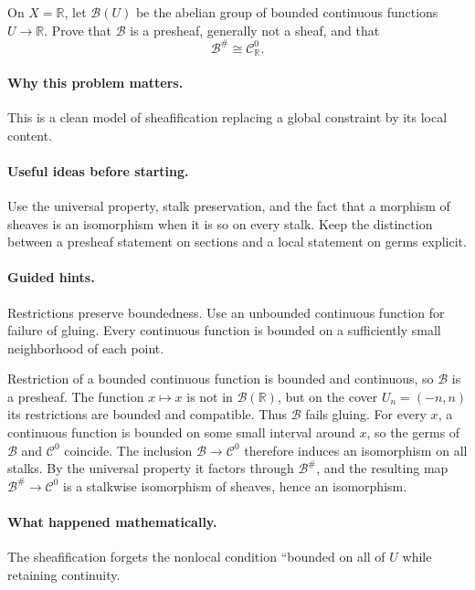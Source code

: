 \begin{problem}
On $X=\mathbb R$, let $\mathcal B(U)$ be the abelian group of bounded continuous functions $U\to\mathbb R$. Prove that $\mathcal B$ is a presheaf, generally not a sheaf, and that
\[
\mathcal B^\#\cong\mathcal C^0_{\mathbb R}.
\]
\end{problem}

\paragraph{Why this problem matters.}
This is a clean model of sheafification replacing a global constraint by its local content.

\paragraph{Useful ideas before starting.}
Use the universal property, stalk preservation, and the fact that a morphism of sheaves is an isomorphism when it is so on every stalk.  Keep the distinction between a presheaf statement on sections and a local statement on germs explicit.

\paragraph{Guided hints.}
Restrictions preserve boundedness.  Use an unbounded continuous function for failure of gluing.  Every continuous function is bounded on a sufficiently small neighborhood of each point.

\ifdefined\FullProblemDossiers
\begin{solution}
Restriction of a bounded continuous function is bounded and continuous, so $\mathcal B$ is a presheaf. The function $x\mapsto x$ is not in $\mathcal B(\mathbb R)$, but on the cover $U_n=(-n,n)$ its restrictions are bounded and compatible. Thus $\mathcal B$ fails gluing. For every $x$, a continuous function is bounded on some small interval around $x$, so the germs of $\mathcal B$ and $\mathcal C^0$ coincide. The inclusion $\mathcal B\to\mathcal C^0$ therefore induces an isomorphism on all stalks. By the universal property it factors through $\mathcal B^\#$, and the resulting map $\mathcal B^\#\to\mathcal C^0$ is a stalkwise isomorphism of sheaves, hence an isomorphism.
\end{solution}

\paragraph{What happened mathematically.}
The sheafification forgets the nonlocal condition ``bounded on all of $U$ while retaining continuity.

